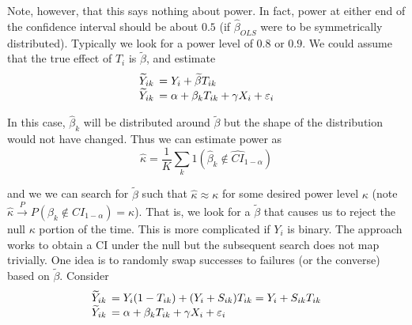 \documentclass{article}
\begin{document}
Note, however, that this says nothing about power. In fact, power at either end of the confidence interval should be about $0.5$ (if $\widehat{\beta}_{OLS}$ were to be symmetrically distributed). Typically we look for a power level of $0.8$ or $0.9$. We could assume that the true effect of $T_i$ is $\widetilde{\beta}$, and estimate
\begin{equation}
  \begin{array}{r@{\hskip 4.5pt}l}
    \widetilde{Y}_{ik} & = Y_{i} + \widetilde{\beta} T_{ik} \\
    \widetilde{Y}_{ik} & = \alpha + \beta_k T_{ik} + \gamma X_{i} + \varepsilon_{i}
  \end{array}
\label{eq:ri_power_reg}
\end{equation}

In this case, $\widehat{\beta}_k$ will be distributed around $\widetilde{\beta}$ but the shape of the distribution would not have changed. Thus we can estimate power as
\begin{equation}
\widehat{\kappa} = \dfrac{1}{K} \sum^{}_{k} 1\left(\widehat{\beta}_k \notin \widehat{CI}_{1 - \alpha}\right)
\label{eq:ri_power_hat}
\end{equation}

and we we can search for $\widetilde{\beta}$ such that $\widehat{\kappa} \approx \kappa$ for some desired power level $\kappa$ (note $\widehat{\kappa} \xrightarrow{P} P\left(\beta_k \notin CI_{1 - \alpha}\right) = \kappa$). That is, we look for a $\widetilde{\beta}$ that causes us to reject the null $\kappa$ portion of the time. This is more complicated if $Y_i$ is binary. The approach works to obtain a CI under the null but the subsequent search does not map trivially. One idea is to randomly swap successes to failures (or the converse) based on $\widetilde{\beta}$. Consider
\begin{equation}
  \begin{array}{r@{\hskip 4.5pt}l}
    \widetilde{Y}_{ik} & = Y_{i} (1 - T_{ik}) + (Y_i + S_{ik}) T_{ik}  = Y_i + S_{ik} T_{ik} \\
    \widetilde{Y}_{ik} & = \alpha + \beta_k T_{ik} + \gamma X_{i} + \varepsilon_{i}
  \end{array}
\label{eq:ri_power_reg_binary}
\end{equation}
\end{document}
